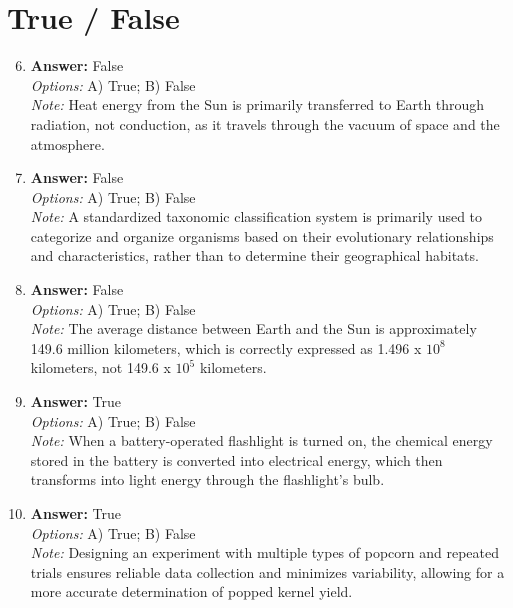 \documentclass[12pt]{article}
\begin{document}
\section*{True / False}
\begin{enumerate}[label=\arabic*.]
\setcounter{enumi}{5}
\item \textbf{Answer:} False
\\ \textit{Options:} A) True; B) False
\\ \textit{Note:} Heat energy from the Sun is primarily transferred to Earth through radiation, not conduction, as it travels through the vacuum of space and the atmosphere.
\item \textbf{Answer:} False
\\ \textit{Options:} A) True; B) False
\\ \textit{Note:} A standardized taxonomic classification system is primarily used to categorize and organize organisms based on their evolutionary relationships and characteristics, rather than to determine their geographical habitats.
\item \textbf{Answer:} False
\\ \textit{Options:} A) True; B) False
\\ \textit{Note:} The average distance between Earth and the Sun is approximately 149.6 million kilometers, which is correctly expressed as 1.496 x $10^8$ kilometers, not 149.6 x $10^5$ kilometers.
\item \textbf{Answer:} True
\\ \textit{Options:} A) True; B) False
\\ \textit{Note:} When a battery-operated flashlight is turned on, the chemical energy stored in the battery is converted into electrical energy, which then transforms into light energy through the flashlight's bulb.
\item \textbf{Answer:} True
\\ \textit{Options:} A) True; B) False
\\ \textit{Note:} Designing an experiment with multiple types of popcorn and repeated trials ensures reliable data collection and minimizes variability, allowing for a more accurate determination of popped kernel yield.
\end{enumerate}
\end{document}
